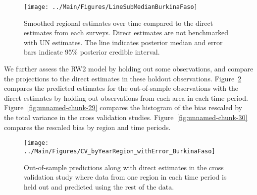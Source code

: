 \documentclass[12pt]{article}\usepackage[]{graphicx}\usepackage[]{color}
\newenvironment{knitrout}{}{} %
\begin{document}
\begin{knitrout}
\color{fgcolor}\begin{figure}[bht]

{\centering \texttt{[image: ../Main/Figures/LineSubMedianBurkinaFaso]} 

}

\caption[Smoothed regional estimates over time compared to the direct estimates from each surveys]{Smoothed regional estimates over time compared to the direct estimates from each surveys. Direct estimates are not benchmarked with UN estimates. The line indicates posterior median and error bars indicate 95\% posterior credible interval.}\label{fig:unnamed-chunk-27}
\end{figure}


\end{knitrout}
We further assess the RW2 model by holding out some observations, and compare the projections to the direct estimates in these holdout observations. Figure~\ref{fig:unnamed-chunk-28} compares the predicted estimates for the out-of-sample observations  with the direct estimates by holding out observations from each area in each time period.  Figure~\ref{fig:unnamed-chunk-29} compares the histogram of the bias rescaled by the total variance in the cross validation studies. Figure~\ref{fig:unnamed-chunk-30} compares the rescaled bias by region and time periods.



 
\begin{knitrout}
\color{fgcolor}\begin{figure}[bht]

{\centering \texttt{[image: ../Main/Figures/CV\_byYearRegion\_withError\_BurkinaFaso]} 

}

\caption[Out-of-sample predictions along with direct estimates in the cross validation study where data from one region in each time period is held out and predicted using the rest of the data]{Out-of-sample predictions along with direct estimates in the cross validation study where data from one region in each time period is held out and predicted using the rest of the data.}\label{fig:unnamed-chunk-28}
\end{figure}


\end{knitrout}
\end{document}
